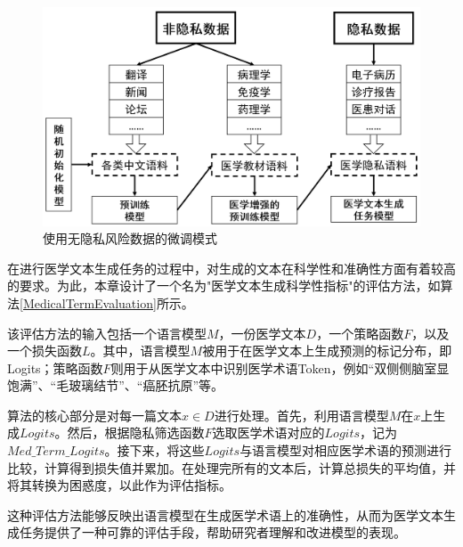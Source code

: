 \begin{figure}[h]
	\centering
	\includegraphics[width=0.8\linewidth]{figures/KnowEnhanceData.png}
	\caption{使用无隐私风险数据的微调模式}
	\label{Chap5_KnowEnhanceData}
\end{figure}




在进行医学文本生成任务的过程中，对生成的文本在科学性和准确性方面有着较高的要求。为此，本章设计了一个名为"医学文本生成科学性指标"的评估方法，如算法\ref{MedicalTermEvaluation}所示。

该评估方法的输入包括一个语言模型$M$，一份医学文本$D$，一个策略函数$F$，以及一个损失函数$L$。其中，语言模型$M$被用于在医学文本上生成预测的标记分布，即Logits；策略函数$F$则用于从医学文本中识别医学术语Token，例如“双侧侧脑室显饱满”、“毛玻璃结节”、“癌胚抗原”等。

算法的核心部分是对每一篇文本$x \in D$进行处理。首先，利用语言模型$M$在$x$上生成$Logits$。然后，根据隐私筛选函数$F$选取医学术语对应的$Logits$，记为$Med\_Term\_Logits$。接下来，将这些$Logits$与语言模型对相应医学术语的预测进行比较，计算得到损失值并累加。在处理完所有的文本后，计算总损失的平均值，并将其转换为困惑度，以此作为评估指标。

这种评估方法能够反映出语言模型在生成医学术语上的准确性，从而为医学文本生成任务提供了一种可靠的评估手段，帮助研究者理解和改进模型的表现。

